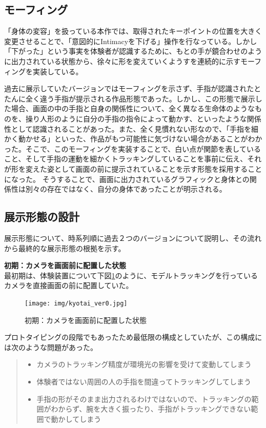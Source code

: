\subsection*{モーフィング}
「身体の変容」を扱っている本作では、取得されたキーポイントの位置を大きく変更させることで、「意図的にIntimacyを下げる」操作を行なっている。しかし「下がった」という事実を体験者が認識するために、もとの手が鏡合わせのように出力されている状態から、徐々に形を変えていくようすを連続的に示すモーフィングを実装している。

過去に展示していたバージョンではモーフィングを示さず、手指が認識されたとたんに全く違う手指が提示される作品形態であった。しかし、この形態で展示した場合、画面の中の手指と自身の関係性について、全く異なる生命体のようなものを、操り人形のように自分の手指の指令によって動かす、といったような関係性として認識されることがあった。また、全く見慣れない形なので、「手指を細かく動かせる」といった、作品がもつ可能性に気づけない場合があることがわかった。そこで、このモーフィングを実装することで、白い点が関節を表していること、そして手指の運動を細かくトラッキングしていることを事前に伝え、それが形を変えた姿として画面の前に提示されていることを示す形態を採用することになった。
そうすることで、画面に出力されているグラフィックと身体との関係性は別々の存在ではなく、自分の身体であったことが明示される。

\subsection{展示形態の設計}
展示形態について、時系列順に過去２つのバージョンについて説明し、その流れから最終的な展示形態の根拠を示す。

\textbf{初期：カメラを画面前に配置した状態}\\
最初期は、体験装置について下図\ref{fig:kyotai_ver0}のように、モデルトラッキングを行っているカメラを直接画面の前に配置していた。
\begin{figure}[H]
  \centering
  \texttt{[image: img/kyotai\_ver0.jpg]}
  \caption{初期：カメラを画面前に配置した状態}
  \label{fig:kyotai_ver0}
\end{figure}

プロトタイピングの段階でもあったため最低限の構成としていたが、この構成には次のような問題があった。
\begin{quote}
  \begin{itemize}
    \item カメラのトラッキング精度が環境光の影響を受けて変動してしまう
    \item 体験者ではない周囲の人の手指を間違ってトラッキングしてしまう
    \item 手指の形がそのまま出力されるわけではないので、トラッキングの範囲がわからず、腕を大きく振ったり、手指がトラッキングできない範囲で動かしてしまう
  \end{itemize}
\end{quote}


